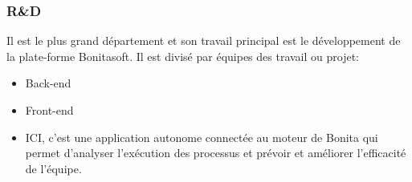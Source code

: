 \subsubsection{R\&D}
Il est le plus grand département et son travail principal est le développement de la plate-forme Bonitasoft.
Il est divisé par équipes des travail ou projet:
\begin{itemize}
  \item Back-end
  \item Front-end
  \item ICI, c'est une application autonome connectée au moteur de Bonita qui permet d'analyser l'exécution
   des processus et prévoir et améliorer l'efficacité de l'équipe.
\end{itemize}
